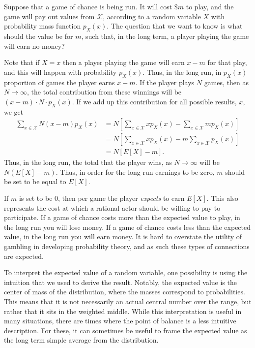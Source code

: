 \documentclass[
  letterpaper,
  DIV=11,
  numbers=noendperiod]{scrreprt}
\theoremstyle{definition}
\theoremstyle{definition}
\theoremstyle{definition}
\theoremstyle{remark}
\begin{document}
\begin{tcolorbox}[enhanced jigsaw, rightrule=.15mm, leftrule=.75mm, opacitybacktitle=0.6, title={Cost for a Game of Chance}, colframe=quarto-callout-tip-color-frame, opacityback=0, coltitle=black, breakable, toptitle=1mm, colbacktitle=quarto-callout-tip-color!10!white, bottomtitle=1mm, titlerule=0mm, arc=.35mm, colback=white, toprule=.15mm, left=2mm, bottomrule=.15mm]

Suppose that a game of chance is being run. It will cost \(\$m\) to
play, and the game will pay out values from \(\mathcal{X}\), according
to a random variable \(X\) with probability mass function \(p_X(x)\).
The question that we want to know is what should the value be for \(m\),
such that, in the long term, a player playing the game will earn no
money?

Note that if \(X=x\) then a player playing the game will earn \(x - m\)
for that play, and this will happen with probability \(p_X(x)\). Thus,
in the long run, in \(p_X(x)\) proportion of games the player earns
\(x-m\). If the player plays \(N\) games, then as \(N\to\infty\), the
total contribution from these winnings will be
\((x-m)\cdot N\cdot p_X(x)\). If we add up this contribution for all
possible results, \(x\), we get \begin{align*}
\sum_{x\in\mathcal{X}} N(x-m)p_X(x) &= N\left[\sum_{x\in\mathcal{X}}xp_X(x) - \sum_{x\in\mathcal{X}} mp_X(x)\right] \\
&= N\left[\sum_{x\in\mathcal{X}}xp_X(x) - m\sum_{x\in\mathcal{X}}p_X(x)\right] \\
&= N\left[E[X] - m\right].
\end{align*} Thus, in the long run, the total that the player wins, as
\(N\to\infty\) will be \(N(E[X] - m)\). Thus, in order for the long run
earnings to be zero, \(m\) should be set to be equal to \(E[X]\).

If \(m\) is set to be \(0\), then per game the player \emph{expects} to
earn \(E[X]\). This also represents the cost at which a rational actor
should be willing to pay to participate. If a game of chance costs more
than the expected value to play, in the long run you will lose money. If
a game of chance costs less than the expected value, in the long run you
will earn money. It is hard to overstate the utility of gambling in
developing probability theory, and as such these types of connections
are expected.

\end{tcolorbox}

To interpret the expected value of a random variable, one possibility is
using the intuition that we used to derive the result. Notably, the
expected value is the center of mass of the distribution, where the
masses correspond to probabilities. This means that it is not
necessarily an actual central number over the range, but rather that it
sits in the weighted middle. While this interpretation is useful in many
situations, there are times where the point of balance is a less
intuitive description. For these, it can sometimes be useful to frame
the expected value as the long term simple average from the
distribution.
\end{document}
